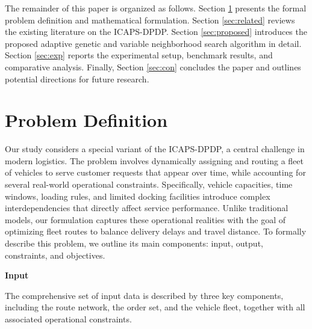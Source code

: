 \documentclass[pdflatex]{sn-jnl}
\begin{document}
The remainder of this paper is organized as follows. Section \ref{sec:problem} presents the formal problem definition and mathematical formulation. Section \ref{sec:related} reviews the existing literature on the ICAPS-DPDP.
Section \ref{sec:proposed} introduces the proposed adaptive genetic and variable neighborhood search algorithm in detail. Section \ref{sec:exp} reports the experimental setup, benchmark results, and comparative analysis. Finally, Section \ref{sec:con} concludes the paper and outlines potential directions for future research.

\section{Problem Definition}\label{sec:problem} 

Our study considers a special variant of the ICAPS-DPDP, a central challenge in modern logistics. The problem involves dynamically assigning and routing a fleet of vehicles to serve customer requests that appear over time, while accounting for several real-world operational constraints. Specifically, vehicle capacities, time windows, loading rules, and limited docking facilities introduce complex interdependencies that directly affect service performance. Unlike traditional models, our formulation captures these operational realities with the goal of optimizing fleet routes to balance delivery delays and travel distance. To formally describe this problem, we outline its main components: input, output, constraints, and objectives.

\textbf{Input}

The comprehensive set of input data is described by three key components, including the route network, the order set, and the vehicle fleet, together with all associated operational constraints.
\end{document}
